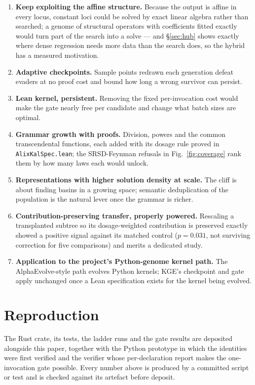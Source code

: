 \documentclass[11pt,a4paper]{article}
\theoremstyle{definition}
\theoremstyle{remark}
\begin{document}
\begin{enumerate}
\item \textbf{Keep exploiting the affine structure.} Because the output is
affine in every locus, constant loci could be solved by exact linear algebra
rather than searched; a genome of structural operators with coefficients fitted
exactly would turn part of the search into a solve --- and
\S\ref{sec:hub} shows exactly where dense regression needs more data than the
search does, so the hybrid has a measured motivation.
\item \textbf{Adaptive checkpoints.} Sample points redrawn each generation defeat
evaders at no proof cost and bound how long a wrong survivor can persist.
\item \textbf{Lean kernel, persistent.} Removing the fixed per-invocation cost
would make the gate nearly free per candidate and change what batch sizes are
optimal.
\item \textbf{Grammar growth with proofs.} Division, powers and the common
transcendental functions, each added with its dosage rule proved in
\texttt{AlixKalSpec.lean}; the SRSD-Feynman refusals in Fig.~\ref{fig:coverage}
rank them by how many laws each would unlock.
\item \textbf{Representations with higher solution density at scale.} The cliff
is about finding basins in a growing space; semantic deduplication of the
population is the natural lever once the grammar is richer.
\item \textbf{Contribution-preserving transfer, properly powered.} Rescaling a
transplanted subtree so its dosage-weighted contribution is preserved exactly
showed a positive signal against its matched control ($p=0.031$, not surviving
correction for five comparisons) and merits a dedicated study.
\item \textbf{Application to the project's Python-genome kernel path.} The
AlphaEvolve-style path evolves Python kernels; KGE's checkpoint and gate apply
unchanged once a Lean specification exists for the kernel being evolved.
\end{enumerate}

\section{Reproduction}

The Rust crate, its tests, the ladder runs and the gate results are deposited
alongside this paper, together with the Python prototype in which the identities
were first verified and the verifier whose per-declaration report makes the
one-invocation gate possible. Every number above is produced by a committed
script or test and is checked against its artefact before deposit.
\end{document}
